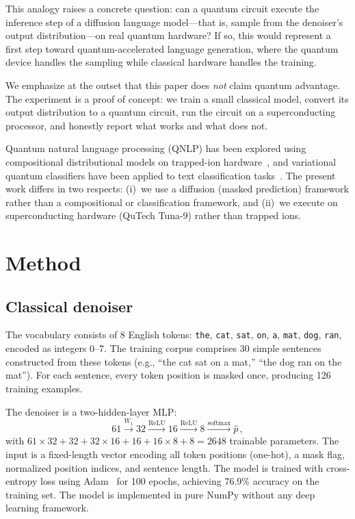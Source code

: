 \documentclass[prl,twocolumn,superscriptaddress,longbibliography,floatfix]{revtex4-2}
\begin{document}
This analogy raises a concrete question: can a quantum circuit execute the inference step of a diffusion language model---that is, sample from the denoiser's output distribution---on real quantum hardware? If so, this would represent a first step toward quantum-accelerated language generation, where the quantum device handles the sampling while classical hardware handles the training.

We emphasize at the outset that this paper does \emph{not} claim quantum advantage. The experiment is a proof of concept: we train a small classical model, convert its output distribution to a quantum circuit, run the circuit on a superconducting processor, and honestly report what works and what does not.

Quantum natural language processing (QNLP) has been explored using compositional distributional models on trapped-ion hardware~\cite{Meichanetzidis2023}, and variational quantum classifiers have been applied to text classification tasks~\cite{Coecke2020}. The present work differs in two respects: (i)~we use a diffusion (masked prediction) framework rather than a compositional or classification framework, and (ii)~we execute on superconducting hardware (QuTech Tuna-9) rather than trapped ions.

\section{Method}

\subsection{Classical denoiser}

The vocabulary consists of 8 English tokens: \texttt{the}, \texttt{cat}, \texttt{sat}, \texttt{on}, \texttt{a}, \texttt{mat}, \texttt{dog}, \texttt{ran}, encoded as integers $0$--$7$. The training corpus comprises 30 simple sentences constructed from these tokens (e.g., ``the cat sat on a mat,'' ``the dog ran on the mat''). For each sentence, every token position is masked once, producing 126 training examples.

The denoiser is a two-hidden-layer MLP:
\begin{equation}
  61 \xrightarrow{W_1} 32 \xrightarrow{\text{ReLU}} 16 \xrightarrow{\text{ReLU}} 8 \xrightarrow{\text{softmax}} \hat{p}\,,
\end{equation}
with $61 \times 32 + 32 + 32 \times 16 + 16 + 16 \times 8 + 8 = 2648$ trainable parameters. The input is a fixed-length vector encoding all token positions (one-hot), a mask flag, normalized position indices, and sentence length. The model is trained with cross-entropy loss using Adam~\cite{Kingma2015} for 100 epochs, achieving 76.9\% accuracy on the training set. The model is implemented in pure NumPy without any deep learning framework.
\end{document}
